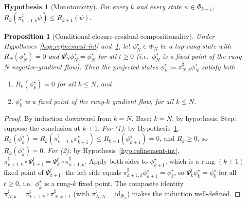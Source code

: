 \documentclass[11pt]{article}
\newtheorem{proposition}[theorem]{Proposition}
\newtheorem{hypothesis}[theorem]{Hypothesis}
\theoremstyle{definition}
\begin{document}
\begin{hypothesis}[Monotonicity]\label{hyp:monotone}
For every $k$ and every state $\psi \in \Phi_{k+1}$,
$R_k(\pi^{\sharp}_{k+1, k} \psi) \leq R_{k+1}(\psi)$.
\end{hypothesis}

\begin{proposition}[Conditional closure-residual compositionality]\label{prop:resid-comp}
Under Hypotheses~\ref{hyp:refinement-int} and~\ref{hyp:monotone},
let $\phi^\star_N \in \Phi_N$ be a top-rung state with
$R_N(\phi^\star_N) = 0$ and $\Psi_N^t \phi^\star_N = \phi^\star_N$
for all $t \geq 0$ (i.e.\ $\phi^\star_N$ is a fixed point of the
rung-$N$ negative-gradient flow). Then the projected states
$\phi^\star_k := \pi^{\sharp}_{N, k} \phi^\star_N$ satisfy both
\begin{enumerate}[leftmargin=2.4em, label=\textup{(\arabic*)}]
\item $R_k(\phi^\star_k) = 0$ for all $k \leq N$, and
\item $\phi^\star_k$ is a fixed point of the rung-$k$ gradient flow,
for all $k \leq N$.
\end{enumerate}
\end{proposition}

\begin{proof}
By induction downward from $k = N$. Base: $k = N$, by hypothesis.
Step: suppose the conclusion at $k{+}1$.
\emph{For (1):} by Hypothesis~\ref{hyp:monotone},
$R_k(\phi^\star_k) = R_k(\pi^{\sharp}_{k+1, k} \phi^\star_{k+1})
\leq R_{k+1}(\phi^\star_{k+1}) = 0$, and $R_k \geq 0$, so
$R_k(\phi^\star_k) = 0$.
\emph{For (2):} by Hypothesis~\ref{hyp:refinement-int},
$\pi^{\sharp}_{k+1, k} \circ \Psi_{k+1}^t = \Psi_k^t \circ
\pi^{\sharp}_{k+1, k}$. Apply both sides to $\phi^\star_{k+1}$, which
is a rung-$(k{+}1)$ fixed point of $\Psi_{k+1}^t$: the left side
equals $\pi^{\sharp}_{k+1, k} \phi^\star_{k+1} = \phi^\star_k$, so
$\Psi_k^t \phi^\star_k = \phi^\star_k$ for all $t \geq 0$, i.e.\
$\phi^\star_k$ is a rung-$k$ fixed point. The composite identity
$\pi^{\sharp}_{N, k} = \pi^{\sharp}_{k+1, k} \circ \pi^{\sharp}_{N, k+1}$
(with $\pi^{\sharp}_{N, N} = \mathrm{id}_{\Phi_N}$) makes the
induction well-defined.
\end{proof}
\end{document}
